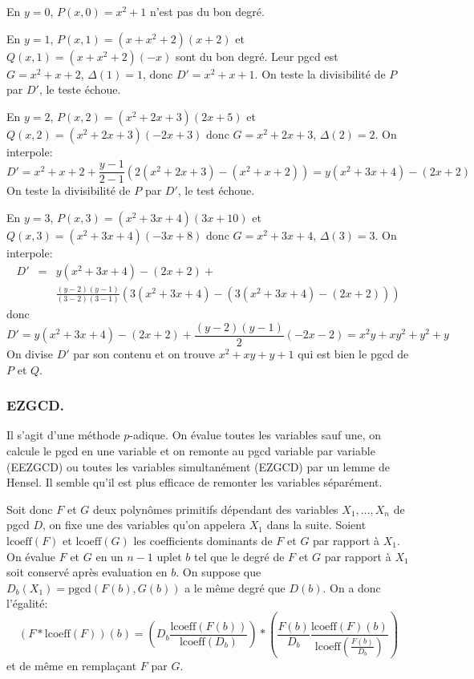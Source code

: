 \documentclass[a4paper,11pt]{article}
\begin{document}
\begin{giacjshere}
En $y = 0$, $P ( x, 0 ) = x^2 + 1$ n'est pas du bon degré.

En $y = 1$, $P ( x, 1 ) = ( x + x^2 + 2 ) ( x + 2 )$ et $Q ( x, 1 ) = ( x +
x^2 + 2 ) ( - x )$ sont du bon degré. Leur pgcd est $G = x^2 + x + 2$, $\Delta
( 1 ) = 1$, donc $D' = x^2 + x + 1$. On teste la divisibilité de $P$ par $D'$,
le teste échoue.

En $y = 2$, $P ( x, 2 ) = ( x^2 + 2 x + 3 ) ( 2 x + 5 )$ et $Q ( x, 2 ) = (
x^2 + 2 x + 3 ) ( - 2 x + 3 )$ donc $G = x^2 + 2 x + 3$, $\Delta ( 2 ) = 2$.
On interpole:
\[ D' = x^2 + x + 2 + \frac{y - 1}{2 - 1} ( 2 ( x^2 + 2 x + 3 ) - ( x^2 + x +
   2 )) = y ( x^2 + 3 x + 4 ) - ( 2 x + 2 ) \]
On teste la divisibilité de $P$ par $D'$, le test échoue.

En $y = 3$, $P ( x, 3 ) = ( x^2 + 3 x + 4 ) ( 3 x + 10 )$ et $Q ( x, 3 ) = (
x^2 + 3 x + 4 ) ( - 3 x + 8 )$ donc $G = x^2 + 3 x + 4$, $\Delta ( 3 ) = 3$.
On interpole:
\begin{eqnarray*}
  D' &= &y ( x^2 + 3 x + 4 ) - ( 2 x + 2 ) + \\
  & & \frac{( y - 2 ) ( y - 1 )}{( 3 - 2
  ) ( 3 - 1 )} \left( 3 ( x^2 + 3 x + 4 ) - ( 3 ( x^2 + 3 x + 4 ) - ( 2 x + 2
  )) \right)
\end{eqnarray*}
donc
\[ D' = y ( x^2 + 3 x + 4 ) - ( 2 x + 2 ) + \frac{( y - 2 ) ( y - 1 )}{2} ( -
   2 x - 2 ) = x^2 y + x y^2 + y^2 + y \]
On divise $D'$ par son contenu et on trouve $x^2 + x y + y + 1$ qui est bien
le pgcd de $P$ et $Q$.

\subsubsection{EZGCD.}

Il s'agit d'une méthode $p$-adique. On évalue toutes les variables sauf une,
on calcule le pgcd en une variable et on remonte au pgcd variable par variable
(EEZGCD) ou toutes les variables simultanément (EZGCD) par un lemme de Hensel.
Il semble qu'il est plus efficace de remonter les variables séparément.

Soit donc $F$ et $G$ deux polynômes primitifs dépendant des variables $X_1,
\ldots, X_n$ de pgcd $D$, on fixe une des variables qu'on appelera $X_1$ dans
la suite. Soient $\mbox{lcoeff} ( F )$ et $\mbox{lcoeff} ( G )$ les
coefficients dominants de $F$ et $G$ par rapport à $X_1$. On évalue $F$ et $G$
en un $n - 1$ uplet $b$ tel que le degré de $F$ et $G$ par rapport à $X_1$
soit conservé après evaluation en $b$. On suppose que $D_b ( X_1 ) =
\mbox{pgcd} ( F ( b ), G ( b ))$ a le même degré que $D ( b )$. On a donc
l'égalité:
\[ ( F \ast \mbox{lcoeff} ( F )) ( b ) = \left( D_b  \frac{\mbox{lcoeff} ( F (
   b ))}{\mbox{lcoeff} ( D_b )} \right) \ast \left( \frac{F ( b )}{D_b} 
   \frac{\mbox{lcoeff} ( F ) ( b )}{\mbox{lcoeff} ( \frac{F ( b )}{D_b} )}
   \right) \]
et de même en remplaçant $F$ par $G$.


\end{giacjshere}
\end{document}
